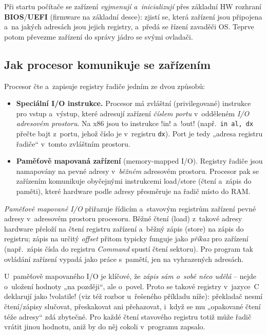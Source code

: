 \begin{poznamka}
Při startu počítače se zařízení \emph{vyjmenují a~inicializují} přes základní HW rozhraní \textbf{BIOS}/\textbf{UEFI} (firmware na základní desce): zjistí se, která zařízení jsou připojena a~na jakých adresách jsou jejich registry, a~předá se řízení zavaděči OS. Teprve potom převezme zařízení do správy jádro se svými ovladači.
\end{poznamka}

\subsection{Jak procesor komunikuje se zařízením}

Procesor čte a~zapisuje registry řadiče jedním ze dvou způsobů:

\begin{itemize}
\item \textbf{Speciální I/O instrukce.} Procesor má zvláštní (privilegované) instrukce pro vstup a~výstup, které adresují zařízení \emph{číslem portu} v~odděleném \emph{I/O adresovém prostoru}. Na x86 jsou to instrukce \cd!in! a~\cd!out! (např.\ \texttt{in al, dx} přečte bajt z~portu, jehož číslo je v~registru \texttt{dx}). Port je tedy „adresa registru řadiče`` v~tomto zvláštním prostoru.
\item \textbf{Paměťově mapovaná zařízení} (memory-mapped I/O). Registry řadiče jsou namapovány na pevné adresy v~\emph{běžném} adresovém prostoru. Procesor pak se zařízením komunikuje obyčejnými instrukcemi load/store (čtení a~zápis do paměti), které hardware podle adresy přesměruje na řadič místo do RAM.
\end{itemize}

\begin{definice}
\emph{Paměťově mapované I/O} přiřazuje řídicím a~stavovým registrům zařízení pevné adresy v~adresovém prostoru procesoru. Běžné čtení (load) z~takové adresy hardware přeloží na čtení registru zařízení a~běžný zápis (store) na zápis do registru; zápis na určitý \emph{offset} přitom typicky funguje jako \emph{příkaz} pro zařízení (např.\ zápis čísla do registru \emph{Command} spustí čtení sektoru). Pro program tak ovládání zařízení vypadá jako práce s~pamětí, jen na vyhrazených adresách.
\end{definice}

\begin{intuice}
U~paměťově mapovaného I/O je klíčové, že \emph{zápis sám o~sobě něco udělá} -- nejde o~uložení hodnoty „na později``, ale o~povel. Proto se takové registry v~jazyce~C deklarují jako \cd!volatile! (viz též rozbor u~řešeného příkladu níže): překladač nesmí čtení/zápisy slučovat, přeskakovat ani přehazovat, i~když se mu „opakované čtení téže adresy`` zdá zbytečné. Pro každé čtení stavového registru totiž může řadič vrátit jinou hodnotu, aniž by do něj cokoli v~programu zapsalo.
\end{intuice}

